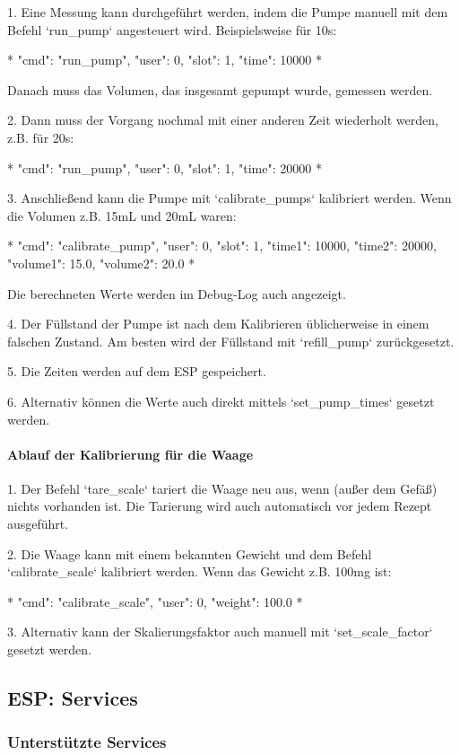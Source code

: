 1. Eine Messung kann durchgeführt werden, indem die Pumpe manuell mit dem Befehl `run\_pump` angesteuert wird. Beispielsweise für 10s:

*
{"cmd": "run\_pump", "user": 0, "slot": 1, "time": 10000}
*

Danach muss das Volumen, das insgesamt gepumpt wurde, gemessen werden.

2. Dann muss der Vorgang nochmal mit einer anderen Zeit wiederholt werden, z.B. für 20s:

*
{"cmd": "run\_pump", "user": 0, "slot": 1, "time": 20000}
*

3. Anschließend kann die Pumpe mit `calibrate\_pumps` kalibriert werden. Wenn die Volumen z.B. 15mL und 20mL waren:

*
{"cmd": "calibrate\_pump", "user": 0, "slot": 1, "time1": 10000, "time2": 20000, "volume1": 15.0, "volume2": 20.0}
*

Die berechneten Werte werden im Debug-Log auch angezeigt.

4. Der Füllstand der Pumpe ist nach dem Kalibrieren üblicherweise in einem falschen Zustand. Am besten wird der Füllstand mit `refill\_pump` zurückgesetzt.

5. Die Zeiten werden auf dem ESP gespeichert.

6. Alternativ können die Werte auch direkt mittels `set\_pump\_times` gesetzt werden.


\paragraph{ Ablauf der Kalibrierung für die Waage}

1. Der Befehl `tare\_scale` tariert die Waage neu aus, wenn (außer dem Gefäß) nichts vorhanden ist. Die Tarierung wird auch automatisch vor jedem Rezept ausgeführt.

2. Die Waage kann mit einem bekannten Gewicht und dem Befehl `calibrate\_scale` kalibriert werden. Wenn das Gewicht z.B. 100mg ist:

*
{"cmd": "calibrate\_scale", "user": 0, "weight": 100.0}
*

3. Alternativ kann der Skalierungsfaktor auch manuell mit `set\_scale\_factor` gesetzt werden.


\subsection{ESP: Services}
\subsubsection{ Unterstützte Services}

